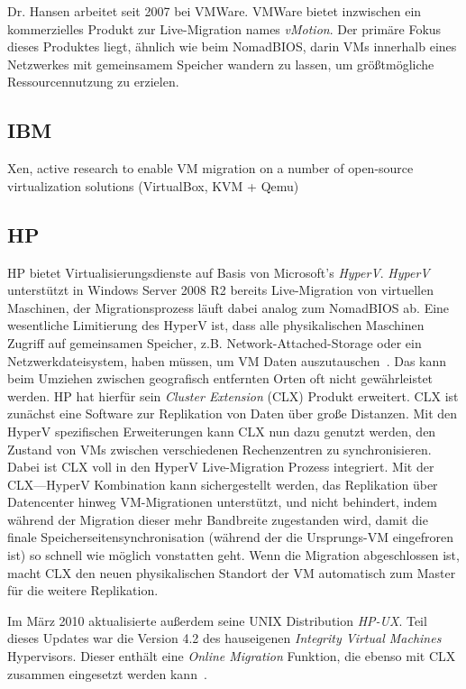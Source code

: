 Dr. Hansen arbeitet seit 2007 bei VMWare. VMWare bietet inzwischen ein
kommerzielles Produkt zur Live-Migration names \emph{vMotion}. Der
primäre Fokus dieses Produktes liegt, ähnlich wie beim NomadBIOS,
darin VMs innerhalb eines Netzwerkes mit gemeinsamem Speicher wandern
zu lassen, um größtmögliche Ressourcennutzung zu erzielen.

\subsection{IBM}
Xen, active research to enable VM migration on a number of open-source
virtualization solutions (VirtualBox, KVM + Qemu)

\subsection{HP}
HP bietet Virtualisierungsdienste auf Basis von Microsoft's
\emph{HyperV}. \emph{HyperV} unterstützt in Windows Server 2008 R2
bereits Live-Migration von virtuellen Maschinen, der Migrationsprozess
läuft dabei analog zum NomadBIOS ab. Eine wesentliche Limitierung des
HyperV ist, dass alle physikalischen Maschinen Zugriff auf gemeinsamen
Speicher, z.B. Network-Attached-Storage oder ein Netzwerkdateisystem,
haben müssen, um VM Daten auszutauschen~\cite{hp2010hyperV}. Das kann
beim Umziehen zwischen geografisch entfernten Orten oft nicht
gewährleistet werden. HP hat hierfür sein \emph{Cluster Extension}
(CLX) Produkt erweitert. CLX ist zunächst eine Software zur
Replikation von Daten über große Distanzen. Mit den HyperV
spezifischen Erweiterungen kann CLX nun dazu genutzt werden, den
Zustand von VMs zwischen verschiedenen Rechenzentren zu
synchronisieren. Dabei ist CLX voll in den HyperV Live-Migration
Prozess integriert. Mit der CLX---HyperV Kombination kann
sichergestellt werden, das Replikation über Datencenter hinweg
VM-Migrationen unterstützt, und nicht behindert, indem während der
Migration dieser mehr Bandbreite zugestanden wird, damit die finale
Speicherseitensynchronisation (während der die Ursprungs-VM
eingefroren ist) so schnell wie möglich vonstatten geht. Wenn die
Migration abgeschlossen ist, macht CLX den neuen physikalischen
Standort der VM automatisch zum Master für die weitere Replikation.

Im März 2010 aktualisierte außerdem seine UNIX Distribution
\emph{HP-UX}. Teil dieses Updates war die Version 4.2 des hauseigenen
\emph{Integrity Virtual Machines} Hypervisors. Dieser enthält eine
\emph{Online Migration} Funktion, die ebenso mit CLX zusammen
eingesetzt werden kann~\cite{hp2010integrity}.

